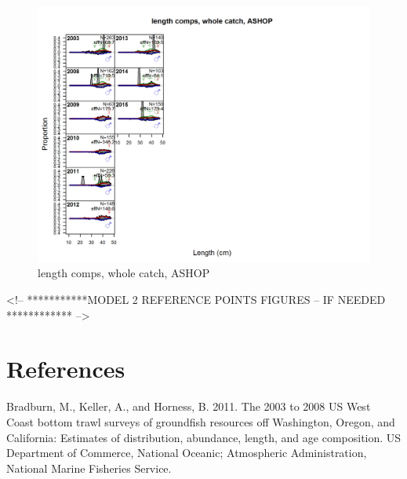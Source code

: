 \documentclass[12pt,]{article}
\begin{document}
\begin{figure}
\centering
\includegraphics{./r4ss/plots_mod1/comp_lenfit_flt2mkt0.png}
\caption{length comps, whole catch, ASHOP
\label{fig:mod1_10_comp_lenfit_flt2mkt0}}
\end{figure}

\FloatBarrier

\FloatBarrier

\FloatBarrier

\FloatBarrier

\FloatBarrier

\FloatBarrier

\FloatBarrier
<!-- ***********MODEL 2 REFERENCE POINTS FIGURES  -- IF NEEDED ************ -->

\newpage

\color{black}

\section*{References}\label{references}

\renewcommand{\thepage}{}

\hypertarget{refs}{}
\hypertarget{ref-bradburn_2003_2011}{}
Bradburn, M., Keller, A., and Horness, B. 2011. The 2003 to 2008 US West
Coast bottom trawl surveys of groundfish resources off Washington,
Oregon, and California: Estimates of distribution, abundance, length,
and age composition. US Department of Commerce, National Oceanic;
Atmospheric Administration, National Marine Fisheries Service.
\end{document}
